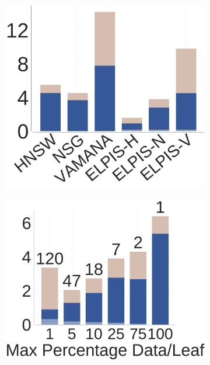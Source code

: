 \begin{figure}[tb]
\begin{minipage}{0.037\textwidth}
\begin{subfigure}{\textwidth}
	\vspace{.5in}	
  \end{subfigure}
	\end{minipage}
	\begin{minipage}{0.27\columnwidth}
	\vspace{0.18in}				
		\begin{subfigure}{\columnwidth}
			\captionsetup{justification=centering}	
			\includegraphics[width=\columnwidth]{../img/elpis/Idx/25_idx_comp.pdf} 
		\end{subfigure}	
	\vspace{-0.27in}
		\caption{{Varying graph structures (Deep25GB)}}
		\label{fig:elpis:design:graph-type}
	\end{minipage}	
	\begin{minipage}{0.295\columnwidth}
		\begin{subfigure}{\columnwidth}
			\includegraphics[width=\columnwidth]{../img/elpis/Idx/25_dpl_comp.pdf} 

\end{subfigure}
\end{minipage}
\end{figure}
